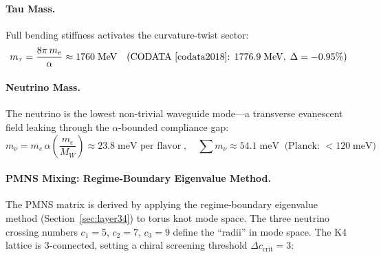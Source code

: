 \paragraph{Tau Mass.}
Full bending stiffness activates the curvature-twist sector:
\begin{equation}
    m_\tau = \frac{8\pi\,m_e}{\alpha}
    \approx 1760\;\text{MeV}
    \quad\text{(CODATA~\cite{codata2018}: } 1776.9\;\text{MeV},\; \Delta = -0.95\%\text{)}
    \label{eq:tau}
\end{equation}

\paragraph{Neutrino Mass.}
The neutrino is the lowest non-trivial waveguide mode---a transverse
evanescent field leaking through the $\alpha$-bounded compliance gap:
\begin{equation}
    m_\nu = m_e\,\alpha\!\left(\frac{m_e}{M_W}\right)
    \approx 23.8\;\text{meV per flavor}
    \;,\quad
    \sum m_\nu \approx 54.1\;\text{meV}
    \;\;\text{(Planck: } < 120\;\text{meV)}
    \label{eq:neutrino}
\end{equation}

\paragraph{PMNS Mixing: Regime-Boundary Eigenvalue Method.}
The PMNS matrix is derived by applying the regime-boundary eigenvalue method
(Section~\ref{sec:layer34}) to torus knot mode space.  The three neutrino
crossing numbers $c_1 = 5$, $c_2 = 7$, $c_3 = 9$ define the ``radii'' in
mode space.  The K4 lattice is 3-connected, setting a chiral screening
threshold $\Delta c_{\text{crit}} = 3$:

